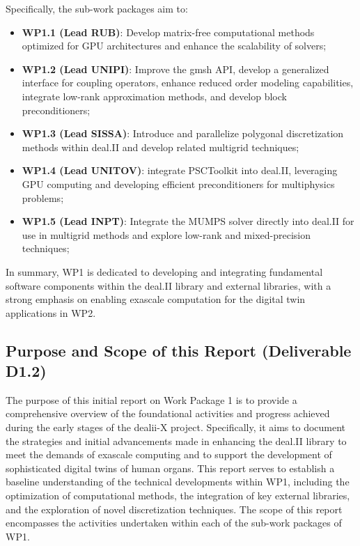 \documentclass[a4paper,12pt]{article}
\begin{document}
Specifically, the sub-work packages aim to:
\begin{itemize}
    \item \textbf{WP1.1 (Lead RUB)}: Develop matrix-free computational methods optimized for GPU architectures and enhance the scalability of solvers;
    \item \textbf{WP1.2 (Lead UNIPI)}: Improve the gmsh API, develop a generalized interface for coupling operators, enhance reduced order modeling capabilities, integrate low-rank approximation methods, and develop block preconditioners;
    \item \textbf{WP1.3 (Lead SISSA)}: Introduce and parallelize polygonal discretization methods within deal.II and develop related multigrid techniques;
    \item \textbf{WP1.4 (Lead UNITOV)}: integrate PSCToolkit into deal.II, leveraging GPU computing and developing efficient preconditioners for multiphysics problems;
    \item \textbf{WP1.5 (Lead INPT)}: Integrate the MUMPS solver directly into deal.II for use in multigrid methods and explore low-rank and mixed-precision techniques;
\end{itemize}

In summary, WP1 is dedicated to developing and integrating fundamental software components within the deal.II library and external libraries, with a strong emphasis on enabling exascale computation for the digital twin applications in WP2.

\subsection{Purpose and Scope of this Report (Deliverable D1.2)}

The purpose of this initial report on Work Package 1 is to provide a
comprehensive overview of the foundational activities and progress achieved
during the early stages of the dealii-X project. Specifically, it aims to
document the strategies and initial advancements made in enhancing the deal.II
library to meet the demands of exascale computing and to support the development
of sophisticated digital twins of human organs. This report serves to establish
a baseline understanding of the technical developments within WP1, including the
optimization of computational methods, the integration of key external
libraries, and the exploration of novel discretization techniques. The scope of
this report encompasses the activities undertaken within each of the sub-work
packages of WP1. 
\end{document}
